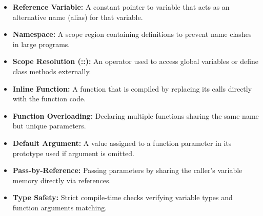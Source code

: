 \documentclass[12pt,a4paper]{article}
\begin{document}
\begin{tcolorbox}[defbox, title={\textbf{One-Line Definitions}}]
\begin{itemize}[leftmargin=*, itemsep=2.5pt, topsep=0pt]
  \item \textbf{Reference Variable:} A constant pointer to variable that acts as an alternative name (alias) for that variable.
  \item \textbf{Namespace:} A scope region containing definitions to prevent name clashes in large programs.
  \item \textbf{Scope Resolution (::):} An operator used to access global variables or define class methods externally.
  \item \textbf{Inline Function:} A function that is compiled by replacing its calls directly with the function code.
  \item \textbf{Function Overloading:} Declaring multiple functions sharing the same name but unique parameters.
  \item \textbf{Default Argument:} A value assigned to a function parameter in its prototype used if argument is omitted.
  \item \textbf{Pass-by-Reference:} Passing parameters by sharing the caller's variable memory directly via references.
  \item \textbf{Type Safety:} Strict compile-time checks verifying variable types and function arguments matching.
\end{itemize}
\end{tcolorbox}
\end{document}
